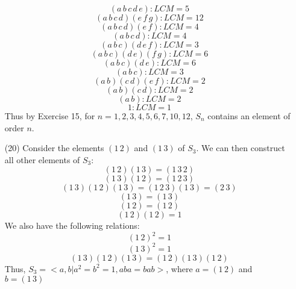 \documentclass[12pt]{article}
\begin{document}
\begin{itemize}
$$(a \, b \, c \, d \, e): LCM = 5$$
$$(a \, b \, c \, d)(e \, f \, g): LCM = 12$$
$$(a \, b \, c \, d)(e \, f): LCM = 4$$
$$(a \, b \, c \, d): LCM = 4$$
$$(a \, b \, c)(d \, e \, f): LCM = 3$$
$$(a \, b \, c)(d \, e)(f \, g): LCM = 6$$
$$(a \, b \, c)(d \, e): LCM = 6$$
$$(a \, b \, c): LCM = 3$$
$$(a \, b)(c \, d)(e \, f): LCM = 2$$
$$(a \, b)(c \, d): LCM = 2$$
$$(a \, b): LCM = 2$$
$$1: LCM = 1$$
Thus by Exercise 15, for $n = 1, 2, 3, 4, 5, 6, 7, 10, 12$, $S_n$ contains an element of order $n$.
\item[(20)]
Consider the elements $(1 \, 2)$ and $(1 \, 3)$ of $S_3$. We can then construct all other elements of $S_3$:
$$(1 \, 2)(1 \, 3) = (1 \, 3 \, 2)$$
$$(1 \, 3)(1 \, 2) = (1 \, 2 \, 3)$$
$$(1 \, 3)(1 \, 2)(1 \, 3) = (1 \, 2 \, 3)(1 \, 3) = (2 \, 3)$$
$$(1 \, 3) = (1 \, 3)$$
$$(1 \, 2) = (1 \, 2)$$
$$(1 \, 2)(1 \, 2) = 1$$
We also have the following relations:
$$(1 \, 2)^2 = 1$$
$$(1 \, 3)^2 = 1$$
$$(1 \, 3)(1 \, 2)(1 \, 3) = (1 \, 2)(1 \, 3)(1 \, 2)$$
Thus, $S_3 = <a, b | a^2 = b^2 = 1, aba = bab>$, where $a = (1 \, 2)$ and $b = (1 \, 3)$
\end{itemize}
\end{document}
